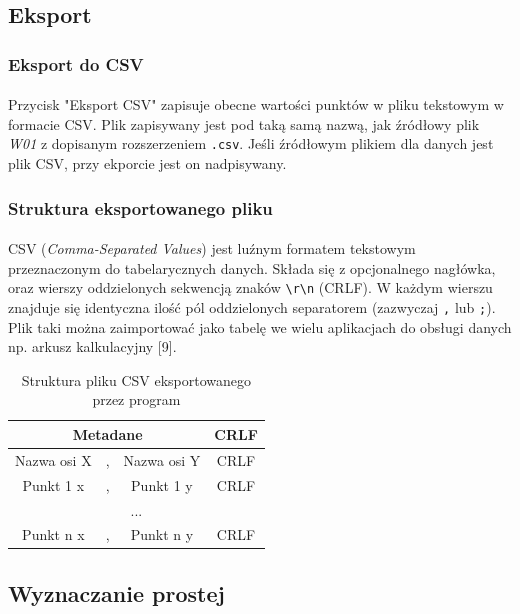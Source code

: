 \documentclass[12pt]{report}
\begin{document}
	
	\subsection{Eksport}
	\subsubsection{Eksport do CSV}
	\paragraph{}
	Przycisk "Eksport CSV" zapisuje obecne wartości punktów w pliku tekstowym w formacie CSV. Plik zapisywany jest pod taką samą nazwą, jak źródłowy plik \textit{W01} z dopisanym rozszerzeniem \verb|.csv|. Jeśli źródłowym plikiem dla danych jest plik CSV, przy ekporcie jest on nadpisywany.
	
	\subsubsection{Struktura eksportowanego pliku}
	\paragraph{}
	CSV (\textit{Comma-Separated Values}) jest luźnym formatem tekstowym przeznaczonym do tabelarycznych danych. Składa się z opcjonalnego nagłówka, oraz wierszy oddzielonych sekwencją znaków \verb|\r\n| (CRLF). W każdym wierszu znajduje się identyczna ilość pól oddzielonych separatorem (zazwyczaj \verb|,| lub \verb|;|). Plik taki można zaimportować jako tabelę we wielu aplikacjach do obsługi danych np. arkusz kalkulacyjny [9].
	
	\begin{table}[H]
		\centering
		\caption{Struktura pliku CSV eksportowanego przez program}
		\begin{tabular}{|c|c|c|c|} \hline
			\multicolumn{3}{|c|}{Metadane} & CRLF \\\hline
			Nazwa osi X & , & Nazwa osi Y & CRLF \\\hline
			Punkt 1 x & , & Punkt 1 y & CRLF\\\hline
			\multicolumn{4}{|c|}{...} \\\hline
			Punkt n x & , & Punkt n y & CRLF  \\\hline
			
		\end{tabular}
	\end{table}
	
	\subsection{Wyznaczanie prostej}
\end{document}
